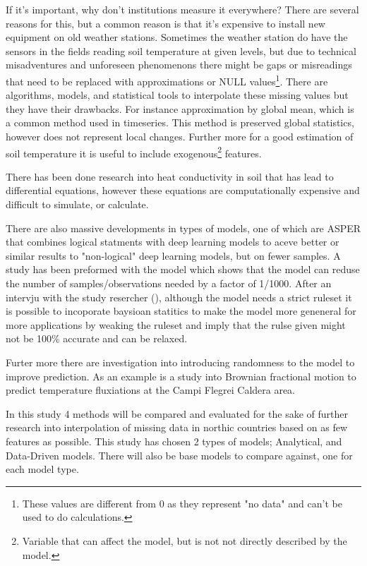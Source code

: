 If it's important, why don't institutions measure it everywhere? There are several reasons for this, but a common reason is that it's expensive to install new equipment on old weather stations. Sometimes the weather station do have the sensors in the fields reading soil temperature at given levels, but due to technical misadventures and unforeseen phenomenons there might be gaps or misreadings that need to be replaced with approximations or NULL values\footnote{These values are different from 0 as they represent "no data" and can't be used to do calculations.}. There are algorithms, models, and statistical tools to interpolate these missing values but they have their drawbacks. For instance approximation by global mean, which is a common method used in timeseries\cite{lepot_interpolation_2017}. This method is preserved global statistics, however does not represent local changes. Further more for a good estimation of soil temperature it is useful to include exogenous\footnote{Variable that can affect the model, but is not not directly described by the model.} features.

There has been done research into heat conductivity in soil that has lead to differential equations\cite{karvonen_model_1988}, however these equations\cite{fourier_analytical_2009,karvonen_model_1988} are computationally expensive and difficult to simulate, or calculate\cite{rankinen_simple_2004}. 

There are also massive developments in types of models, one of which are ASPER\cite{le_asper_2023} that combines logical statments with deep learning models to aceve better or similar results to "non-logical" deep learning models, but on fewer samples. A study has been preformed with the model which shows that the model can reduse the number of samples/observations needed by a factor of 1/1000\cite{machot_bridging_2023}. After an intervju with the study resercher (\citeauthor{machot_bridging_2023}), although the model needs a strict ruleset it is possible to incoporate baysioan statitics to make the model more geneneral for more applications by weaking the ruleset and imply that the rulse given might not be 100\% accurate and can be relaxed. 

Furter more there are investigation into introducing randomness to the model to improve prediction. As an example is a study into Brownian fractional motion to predict temperature fluxiations at the Campi Flegrei Caldera area. 

In this study 4 methods will be compared and evaluated for the sake of further research into interpolation of missing data in northic countries based on as few features as possible. This study has chosen 2 types of models; Analytical, and Data-Driven models. There will also be base models to compare against, one for each model type. 